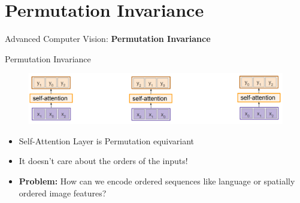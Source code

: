 \section{Permutation Invariance}
\begin{frame}{}
    \LARGE Advanced Computer Vision: \textbf{Permutation Invariance}
\end{frame}

\begin{frame}{Permutation Invariance}
\begin{figure}
\centering
\includegraphics[width=1.0\textwidth,height=1.0\textheight,keepaspectratio]{images/advanced-cv/attention_31.png}
\end{figure}

\begin{itemize}
    \item Self-Attention Layer is Permutation equivariant
    \item It doesn’t care about the orders of the inputs!
    \item \textbf{Problem:} How can we encode ordered sequences like language or spatially ordered image features?
\end{itemize}
    
\end{frame}


